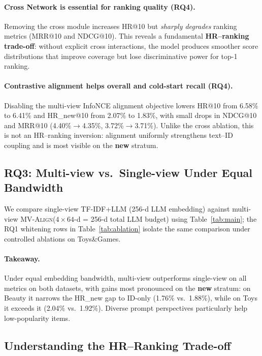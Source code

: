 \documentclass[sigconf,natbib=true,anonymous]{acmart}
\newcommand{\model}{\textsc{MV-Align}\xspace}
\begin{document}
\paragraph{Cross Network is essential for ranking quality (RQ4).}
Removing the cross module increases HR@10 but \emph{sharply degrades}
ranking metrics (MRR@10 and NDCG@10).
This reveals a fundamental \textbf{HR--ranking trade-off}: without
explicit cross interactions, the model produces smoother score
distributions that improve coverage but lose discriminative power
for top-1 ranking.

\paragraph{Contrastive alignment helps overall and cold-start recall (RQ4).}
Disabling the multi-view InfoNCE alignment objective lowers HR@10
from 6.58\% to 6.41\% and HR\_new@10 from 2.07\% to 1.83\%, with
small drops in NDCG@10 and MRR@10 (4.40\%$\rightarrow$4.35\%,
3.72\%$\rightarrow$3.71\%).
Unlike the cross ablation, this is not an HR--ranking inversion:
alignment uniformly strengthens text--ID coupling and is most
visible on the \textbf{new} stratum.

\subsection{RQ3: Multi-view vs.\ Single-view Under Equal Bandwidth}

We compare single-view TF-IDF+LLM (256-d LLM embedding) against
multi-view \model ($4\times 64$-d = 256-d total LLM budget) using
Table~\ref{tab:main}; the RQ1 whitening rows in Table~\ref{tab:ablation}
isolate the same comparison under controlled ablations on Toys\&Games.

\paragraph{Takeaway.}
Under equal embedding bandwidth, multi-view outperforms
single-view on all metrics on both datasets, with gains most
pronounced on the \textbf{new} stratum: on Beauty it narrows the
HR\_new gap to ID-only (1.76\% vs.\ 1.88\%), while on Toys it
exceeds it (2.04\% vs.\ 1.92\%). Diverse prompt perspectives
particularly help low-popularity items.

\subsection{Understanding the HR--Ranking Trade-off}
\end{document}
